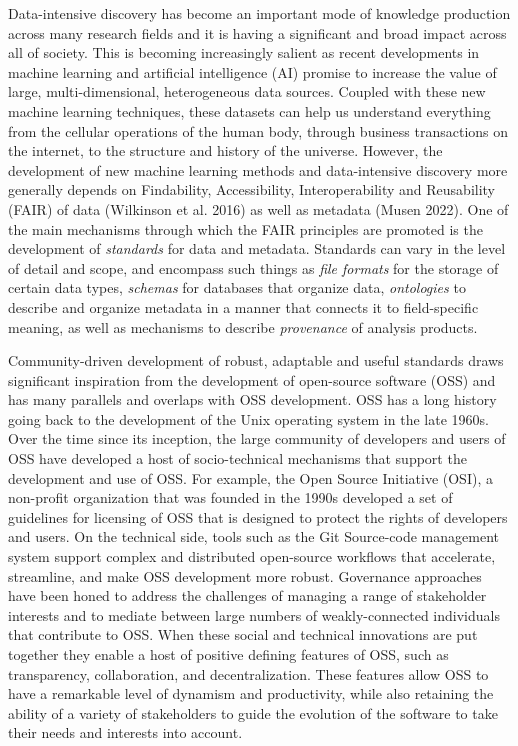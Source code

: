 \documentclass[
  letterpaper,
  DIV=11,
  numbers=noendperiod]{scrartcl}
\begin{document}
Data-intensive discovery has become an important mode of knowledge
production across many research fields and it is having a significant
and broad impact across all of society. This is becoming increasingly
salient as recent developments in machine learning and artificial
intelligence (AI) promise to increase the value of large,
multi-dimensional, heterogeneous data sources. Coupled with these new
machine learning techniques, these datasets can help us understand
everything from the cellular operations of the human body, through
business transactions on the internet, to the structure and history of
the universe. However, the development of new machine learning methods
and data-intensive discovery more generally depends on Findability,
Accessibility, Interoperability and Reusability (FAIR) of data
(Wilkinson et al. 2016) as well as metadata (Musen 2022). One of the
main mechanisms through which the FAIR principles are promoted is the
development of \emph{standards} for data and metadata. Standards can
vary in the level of detail and scope, and encompass such things as
\emph{file formats} for the storage of certain data types,
\emph{schemas} for databases that organize data, \emph{ontologies} to
describe and organize metadata in a manner that connects it to
field-specific meaning, as well as mechanisms to describe
\emph{provenance} of analysis products.

Community-driven development of robust, adaptable and useful standards
draws significant inspiration from the development of open-source
software (OSS) and has many parallels and overlaps with OSS development.
OSS has a long history going back to the development of the Unix
operating system in the late 1960s. Over the time since its inception,
the large community of developers and users of OSS have developed a host
of socio-technical mechanisms that support the development and use of
OSS. For example, the Open Source Initiative (OSI), a non-profit
organization that was founded in the 1990s developed a set of guidelines
for licensing of OSS that is designed to protect the rights of
developers and users. On the technical side, tools such as the Git
Source-code management system support complex and distributed
open-source workflows that accelerate, streamline, and make OSS
development more robust. Governance approaches have been honed to
address the challenges of managing a range of stakeholder interests and
to mediate between large numbers of weakly-connected individuals that
contribute to OSS. When these social and technical innovations are put
together they enable a host of positive defining features of OSS, such
as transparency, collaboration, and decentralization. These features
allow OSS to have a remarkable level of dynamism and productivity, while
also retaining the ability of a variety of stakeholders to guide the
evolution of the software to take their needs and interests into
account.
\end{document}
